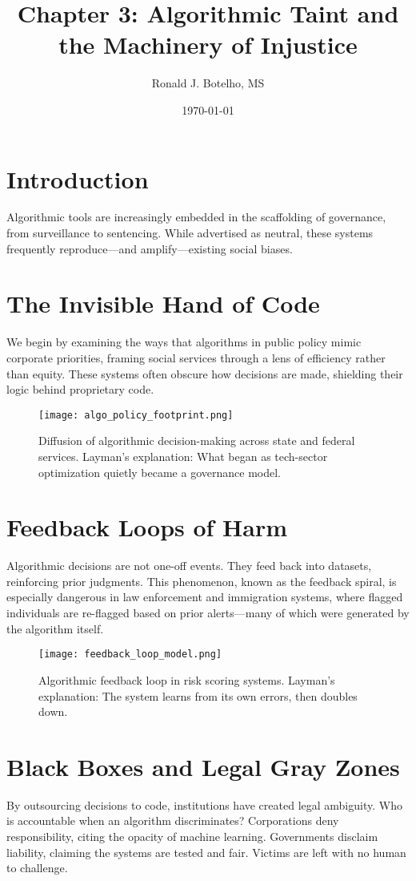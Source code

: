 \documentclass[12pt]{article}
\title{Chapter 3: Algorithmic Taint and the Machinery of Injustice}
\author{Ronald J. Botelho, MS}
\date{\today}
\begin{document}
\maketitle

\section*{Introduction}
Algorithmic tools are increasingly embedded in the scaffolding of governance, from surveillance to sentencing. While advertised as neutral, these systems frequently reproduce—and amplify—existing social biases.

\section*{The Invisible Hand of Code}
We begin by examining the ways that algorithms in public policy mimic corporate priorities, framing social services through a lens of efficiency rather than equity. These systems often obscure how decisions are made, shielding their logic behind proprietary code.

\begin{figure}[ht]
  \centering
  \texttt{[image: algo\_policy\_footprint.png]}
  \caption{Diffusion of algorithmic decision-making across state and federal services. Layman's explanation: What began as tech-sector optimization quietly became a governance model.}
\end{figure}

\section*{Feedback Loops of Harm}
Algorithmic decisions are not one-off events. They feed back into datasets, reinforcing prior judgments. This phenomenon, known as the feedback spiral, is especially dangerous in law enforcement and immigration systems, where flagged individuals are re-flagged based on prior alerts—many of which were generated by the algorithm itself.

\begin{figure}[ht]
  \centering
  \texttt{[image: feedback\_loop\_model.png]}
  \caption{Algorithmic feedback loop in risk scoring systems. Layman's explanation: The system learns from its own errors, then doubles down.}
\end{figure}

\section*{Black Boxes and Legal Gray Zones}
By outsourcing decisions to code, institutions have created legal ambiguity. Who is accountable when an algorithm discriminates? Corporations deny responsibility, citing the opacity of machine learning. Governments disclaim liability, claiming the systems are tested and fair. Victims are left with no human to challenge.
\end{document}
